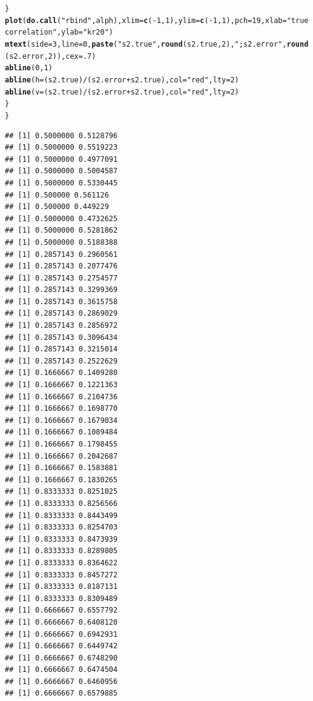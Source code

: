 \documentclass{article}\usepackage[]{graphicx}\usepackage[]{color}
\makeatletter
\newcommand{\hlnum}[1]{\textcolor[rgb]{0.686,0.059,0.569}{#1}}%
\newcommand{\hlstr}[1]{\textcolor[rgb]{0.192,0.494,0.8}{#1}}%
\newcommand{\hlopt}[1]{\textcolor[rgb]{0,0,0}{#1}}%
\newcommand{\hlstd}[1]{\textcolor[rgb]{0.345,0.345,0.345}{#1}}%
\newcommand{\hlkwc}[1]{\textcolor[rgb]{0.333,0.667,0.333}{#1}}%
\newcommand{\hlkwd}[1]{\textcolor[rgb]{0.737,0.353,0.396}{\textbf{#1}}}%
\newenvironment{kframe}{%
 \def\at@end@of@kframe{}%
 \ifinner\ifhmode%
  \def\at@end@of@kframe{\end{minipage}}%
  \begin{minipage}{\columnwidth}%
 \fi\fi%
 \def\FrameCommand##1{\hskip\@totalleftmargin \hskip-\fboxsep
 \colorbox{shadecolor}{##1}\hskip-\fboxsep
     \hskip-\linewidth \hskip-\@totalleftmargin \hskip\columnwidth}%
 \MakeFramed {\advance\hsize-\width
   \@totalleftmargin\z@ \linewidth\hsize
   \@setminipage}}%
 {\par\unskip\endMakeFramed%
 \at@end@of@kframe}
\newenvironment{knitrout}{}{} %
\makeatother
\begin{document}
\begin{knitrout}
\begin{kframe}
\begin{alltt}
        \hlstd{\}}
        \hlkwd{plot}\hlstd{(}\hlkwd{do.call}\hlstd{(}\hlstr{"rbind"}\hlstd{,alph),}\hlkwc{xlim}\hlstd{=}\hlkwd{c}\hlstd{(}\hlopt{-}\hlnum{1}\hlstd{,}\hlnum{1}\hlstd{),}\hlkwc{ylim}\hlstd{=}\hlkwd{c}\hlstd{(}\hlopt{-}\hlnum{1}\hlstd{,}\hlnum{1}\hlstd{),}\hlkwc{pch}\hlstd{=}\hlnum{19}\hlstd{,}\hlkwc{xlab}\hlstd{=}\hlstr{"true correlation"}\hlstd{,}\hlkwc{ylab}\hlstd{=}\hlstr{"kr20"}\hlstd{)}
        \hlkwd{mtext}\hlstd{(}\hlkwc{side}\hlstd{=}\hlnum{3}\hlstd{,}\hlkwc{line}\hlstd{=}\hlnum{0}\hlstd{,}\hlkwd{paste}\hlstd{(}\hlstr{"s2.true"}\hlstd{,}\hlkwd{round}\hlstd{(s2.true,}\hlnum{2}\hlstd{),}\hlstr{"; s2.error"}\hlstd{,}\hlkwd{round}\hlstd{(s2.error,}\hlnum{2}\hlstd{)),}\hlkwc{cex}\hlstd{=}\hlnum{.7}\hlstd{)}
        \hlkwd{abline}\hlstd{(}\hlnum{0}\hlstd{,}\hlnum{1}\hlstd{)}
        \hlkwd{abline}\hlstd{(}\hlkwc{h}\hlstd{=(s2.true)}\hlopt{/}\hlstd{(s2.error}\hlopt{+}\hlstd{s2.true),}\hlkwc{col}\hlstd{=}\hlstr{"red"}\hlstd{,}\hlkwc{lty}\hlstd{=}\hlnum{2}\hlstd{)}
        \hlkwd{abline}\hlstd{(}\hlkwc{v}\hlstd{=(s2.true)}\hlopt{/}\hlstd{(s2.error}\hlopt{+}\hlstd{s2.true),}\hlkwc{col}\hlstd{=}\hlstr{"red"}\hlstd{,}\hlkwc{lty}\hlstd{=}\hlnum{2}\hlstd{)}
    \hlstd{\}}
\hlstd{\}}
\end{alltt}
\begin{verbatim}
## [1] 0.5000000 0.5128796
## [1] 0.5000000 0.5519223
## [1] 0.5000000 0.4977091
## [1] 0.5000000 0.5004587
## [1] 0.5000000 0.5330445
## [1] 0.500000 0.561126
## [1] 0.500000 0.449229
## [1] 0.5000000 0.4732625
## [1] 0.5000000 0.5281862
## [1] 0.5000000 0.5188388
## [1] 0.2857143 0.2960561
## [1] 0.2857143 0.2077476
## [1] 0.2857143 0.2754577
## [1] 0.2857143 0.3299369
## [1] 0.2857143 0.3615758
## [1] 0.2857143 0.2869029
## [1] 0.2857143 0.2856972
## [1] 0.2857143 0.3096434
## [1] 0.2857143 0.3215014
## [1] 0.2857143 0.2522629
## [1] 0.1666667 0.1409280
## [1] 0.1666667 0.1221363
## [1] 0.1666667 0.2104736
## [1] 0.1666667 0.1698770
## [1] 0.1666667 0.1679034
## [1] 0.1666667 0.1089484
## [1] 0.1666667 0.1798455
## [1] 0.1666667 0.2042687
## [1] 0.1666667 0.1583881
## [1] 0.1666667 0.1830265
## [1] 0.8333333 0.8251025
## [1] 0.8333333 0.8256566
## [1] 0.8333333 0.8443499
## [1] 0.8333333 0.8254703
## [1] 0.8333333 0.8473939
## [1] 0.8333333 0.8289805
## [1] 0.8333333 0.8364622
## [1] 0.8333333 0.8457272
## [1] 0.8333333 0.8187131
## [1] 0.8333333 0.8309489
## [1] 0.6666667 0.6557792
## [1] 0.6666667 0.6408120
## [1] 0.6666667 0.6942931
## [1] 0.6666667 0.6449742
## [1] 0.6666667 0.6748290
## [1] 0.6666667 0.6474504
## [1] 0.6666667 0.6460956
## [1] 0.6666667 0.6579885

\end{verbatim}
\end{kframe}
\end{knitrout}
\end{document}
